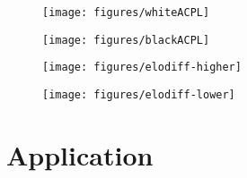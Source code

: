 \documentclass[12pt, letterpaper, titlepage]{article}
\begin{document}
\begin{figure}
    \centering
    \texttt{[image: figures/whiteACPL]}
    \caption{}
    \label{fig:white_acpl}
\end{figure}

\begin{figure}
    \centering
    \texttt{[image: figures/blackACPL]}
    \caption{}
    \label{fig:black_acpl}
\end{figure}

\begin{figure}
    \centering
    \texttt{[image: figures/elodiff-higher]}
    \caption{}
    \label{fig:elodiff-higher}
\end{figure}

\begin{figure}
    \centering
    \texttt{[image: figures/elodiff-lower]}
    \caption{}
    \label{fig:elodiff-lower}
\end{figure}

\section*{Application}
\label{sec:app}
\end{document}
